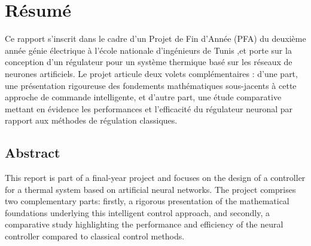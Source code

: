 \chapter*{Résumé}
Ce rapport s'inscrit dans le cadre d'un Projet de Fin d'Année (PFA) du deuxième année génie électrique à l'école nationale d'ingénieurs de Tunis ,et porte sur la conception d'un régulateur pour un système thermique basé sur les réseaux de neurones artificiels. Le projet articule deux volets complémentaires : d'une part, une présentation rigoureuse des fondements mathématiques sous-jacents à cette approche de commande intelligente, et d'autre part, une étude comparative mettant en évidence les performances et l'efficacité du régulateur neuronal par rapport aux méthodes de régulation classiques.

\vspace{1cm}

\section*{Abstract}
This report is part of a final-year project and focuses on the design of a controller for a thermal system based on artificial neural networks. The project comprises two complementary parts: firstly, a rigorous presentation of the mathematical foundations underlying this intelligent control approach, and secondly, a comparative study highlighting the performance and efficiency of the neural controller compared to classical control methods.